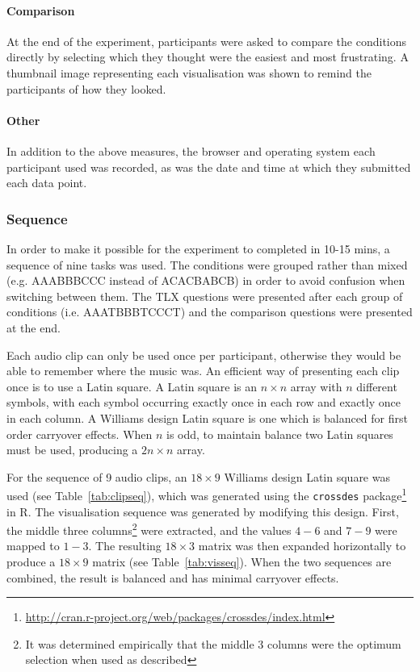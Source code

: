 \paragraph{Comparison}
At the end of the experiment, participants were asked to compare the conditions
directly by selecting which they thought were the easiest and most frustrating.
A thumbnail image representing each visualisation was shown to remind the
participants of how they looked.

\paragraph{Other}
In addition to the above measures, the browser and operating system each
participant used was recorded, as was the date and time at which they
submitted each data point.

\subsubsection{Sequence}\label{sec:studysequence}
In order to make it possible for the experiment to completed in 10-15 mins, a
sequence of nine tasks was used. The conditions were grouped rather than mixed
(e.g. AAABBBCCC instead of ACACBABCB) in order to avoid confusion when
switching between them. The TLX questions were presented after each group of
conditions (i.e. AAATBBBTCCCT) and the comparison questions were presented at
the end.

Each audio clip can only be used once per participant, otherwise they would be
able to remember where the music was. An efficient way of presenting each clip
once is to use a Latin square. A Latin square is an $n \times n$ array with $n$
different symbols, with each symbol occurring exactly once in each row and
exactly once in each column. A Williams design Latin square \cite{Williams1949}
is one which is balanced for first order carryover effects.  When $n$ is odd,
to maintain balance two Latin squares must be used, producing a $2n \times n$
array.

For the sequence of 9 audio clips, an $18\times9$ Williams design Latin square
was used (see Table~\ref{tab:clipseq}), which was generated using the
\texttt{crossdes}
package\footnote{\url{http://cran.r-project.org/web/packages/crossdes/index.html}}
in R. The visualisation sequence was generated by modifying this design. First,
the middle three columns\footnote{It was determined empirically that the
  middle 3 columns were the optimum selection when used as described} were
extracted, and the values $4-6$ and $7-9$ were mapped to $1-3$. The resulting
$18\times3$ matrix was then expanded horizontally to produce a $18\times9$
matrix (see Table~\ref{tab:visseq}). When the two sequences are combined, the
result is balanced and has minimal carryover effects.

